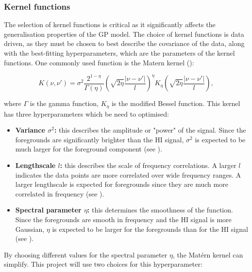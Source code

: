 \subsubsection{Kernel functions}

The selection of kernel functions is critical as it significantly affects the generalisation properties of the GP model. The choice of kernel functions is data driven, as they must be chosen to best describe the covariance of the data, along with the best-fitting hyperparameters, which are the parameters of the kernel functions. One commonly used function is the Matern kernel (\cite{rasmussenGaussianProcessesMachine2008}):

\begin{equation}
    K(\nu, \nu') = \sigma^2 \frac{2^{1-\eta}}{\Gamma(\eta)}(\sqrt{2\eta}\frac{|\nu - \nu'|}{l})^\eta K_\eta (\sqrt{2\eta}\frac{|\nu - \nu'|}{l}),
\end{equation}

where $\Gamma$ is the gamma function, $K_\eta$ is the modified Bessel function. This kernel has three hyperparameters which be need to optimised:

\begin{itemize}
    \item \textbf{Variance $\sigma^2$:} this describes the amplitude or "power" of the signal. Since the foregrounds are significantly brighter than the HI signal, $\sigma^2$ is expected to be much larger for the foreground component (see ).
    \item \textbf{Lengthscale $l$:} this describes the scale of frequency correlations. A larger $l$ indicates the data points are more correlated over wide frequency ranges. A larger lengthscale is expected for foregrounds since they are much more correlated in frequency (see ).
    \item \textbf{Spectral parameter $\eta$:} this determines the smoothness of the function. Since the foregrounds are smooth in frequency and the HI signal is more Gaussian, $\eta$ is expected to be larger for the foregrounds than for the HI signal (see ).
\end{itemize}

By choosing different values for the spectral parameter $\eta$, the Mat\'ern kernel can simplify. This project will use two choices for this hyperparameter:

